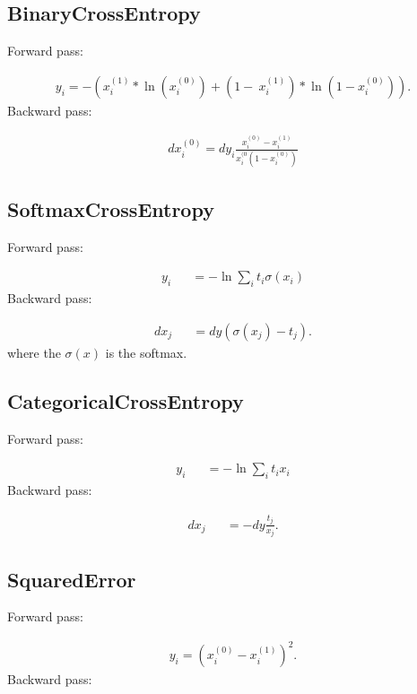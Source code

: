 \documentclass{article}
\begin{document}
\subsection{BinaryCrossEntropy}

Forward pass:

\begin{eqnarray}
  y_i = - \left(x^{(1)}_i * \ln \left(x^{(0)}_i\right) + \left(1 - \
  x^{(1)}_i\right) * \ln \left(1 - x^{(0)}_i\right)\right).
\end{eqnarray}
%
Backward pass:

\begin{eqnarray}
  dx^{(0)}_i = dy_i \frac{x^{(0)}_i - x^{(1)}_i}{x^{(0}_i (1 - x^{(0)}_i)}
\end{eqnarray}


\subsection{SoftmaxCrossEntropy}

Forward pass:

\begin{eqnarray}
  y_{i} &&= -\ln \sum_i t_i \sigma(x_i)
\end{eqnarray}
%
Backward pass:

\begin{eqnarray}
  dx_{j} &&= dy (\sigma(x_j) - t_j).
\end{eqnarray}
%
where the $\sigma(x)$ is the softmax.

\subsection{CategoricalCrossEntropy}

Forward pass:

\begin{eqnarray}
  y_{i} &&= -\ln \sum_i t_i x_i
\end{eqnarray}
%
Backward pass:

\begin{eqnarray}
  dx_{j} && = -dy \frac{t_j}{x_j}.
\end{eqnarray}


\subsection{SquaredError}

Forward pass:

\begin{eqnarray}
  y_i = \left(x^{(0)}_i - x^{(1)}_i\right)^2.
\end{eqnarray}
%
Backward pass:
\end{document}
